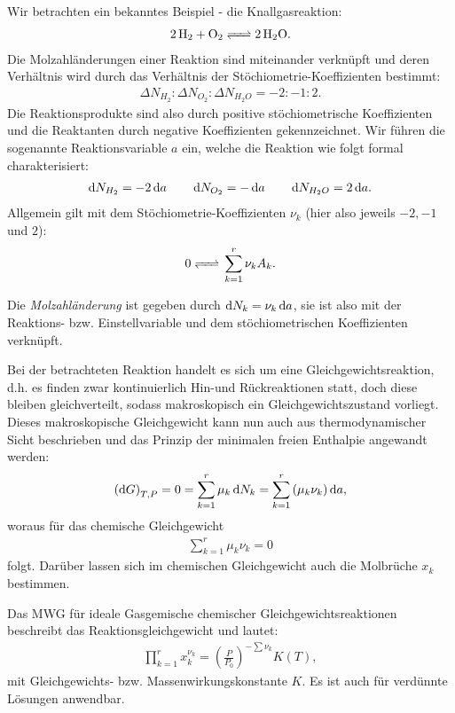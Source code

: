 Wir betrachten ein bekanntes Beispiel - die Knallgasreaktion:
\begin{align*}
    \ce{2H2 + O2 <=> 2H2O}.
\end{align*}
Die Molzahländerungen einer Reaktion sind miteinander verknüpft und deren Verhältnis wird durch das Verhältnis der Stöchiometrie-Koeffizienten bestimmt: 
\begin{align*}
    \Delta N_{H_2}:\Delta N_{O_2}:\Delta N_{H_2O}=-2:-1:2.
\end{align*}
Die Reaktionsprodukte sind also durch positive stöchiometrische Koeffizienten und die Reaktanten durch negative Koeffizienten gekennzeichnet.
Wir führen die sogenannte Reaktionsvariable $a$ ein, welche die Reaktion wie folgt formal charakterisiert:
\begin{align*}
    \mathop{}\!\mathrm{d} N_{H_2}=-2\mathop{}\!\mathrm{d} a\qquad \mathop{}\!\mathrm{d} N_{O_2}=-\mathop{}\!\mathrm{d} a \qquad \mathop{}\!\mathrm{d} N_{H_2O}=2\mathop{}\!\mathrm{d} a.
\end{align*}
Allgemein gilt mit dem Stöchiometrie-Koeffizienten $\nu_k$ (hier also jeweils $-2,-1$ und $2$):
\begin{align*}
    \ce{0 <=>} \sum_{k=1}^{r}\nu_k A_k.
\end{align*}
\begin{formal}
   Die \emph{Molzahländerung} ist gegeben durch $\mathop{}\!\mathrm{d} N_k=\nu_k \mathop{}\!\mathrm{d} a$, sie ist also mit der Reaktions- bzw. Einstellvariable und dem stöchiometrischen Koeffizienten verknüpft. 
\end{formal}

Bei der betrachteten Reaktion handelt es sich um eine Gleichgewichtsreaktion, d.h. es finden zwar kontinuierlich Hin-und Rückreaktionen statt, doch diese bleiben gleichverteilt, sodass makroskopisch ein Gleichgewichtszustand vorliegt. Dieses makroskopische Gleichgewicht kann nun auch aus thermodynamischer Sicht beschrieben und das Prinzip der minimalen freien Enthalpie angewandt werden:
\begin{align*}
    \left(\mathop{}\!\mathrm{d} G\right)_{T,P}=0=\sum_{k=1}^{r}\mu_k\mathop{}\!\mathrm{d} N_k=\sum_{k=1}^{r}\left(\mu_k\nu_k\right)\mathop{}\!\mathrm{d} a,
\end{align*} 
woraus für das chemische Gleichgewicht 
\begin{align*}
    \boxed{\sum_{k=1}^{r}\mu_k\nu_k=0}
\end{align*}
folgt. Darüber lassen sich im chemischen Gleichgewicht auch die Molbrüche $x_k$ bestimmen.
\begin{formal}
    Das MWG für ideale Gasgemische chemischer Gleichgewichtsreaktionen beschreibt das Reaktionsgleichgewicht und lautet:
    \begin{align*}
        \prod_{k=1}^{r}x_k^{\nu_k}=\left(\frac{P}{P_0}\right)^{-\sum\nu_k}K(T),
    \end{align*}
    mit Gleichgewichts- bzw. Massenwirkungskonstante $K$. Es ist auch für verdünnte Lösungen anwendbar.
\end{formal}
